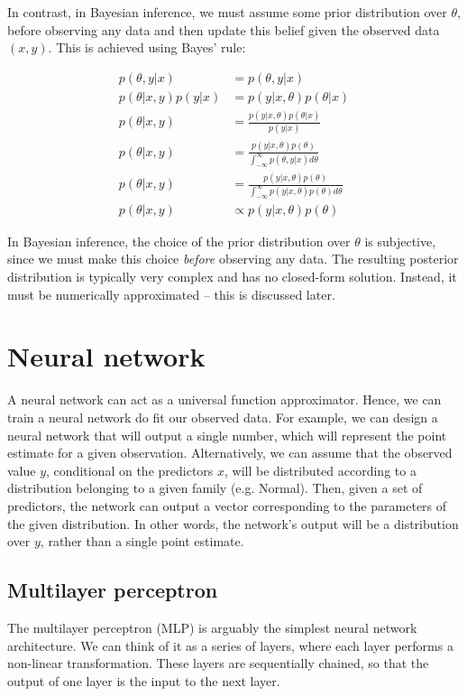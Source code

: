 \documentclass[12pt]{article}
\begin{document}
In contrast, in Bayesian inference, we must assume some prior distribution over $\theta$, before observing any data and then update this belief given the observed data $(x, y)$. This is achieved using Bayes' rule:

\begin{align}
p(\theta,y|x) &= p(\theta,y|x) \\
p(\theta|x,y)p(y|x) &= p(y|x,\theta)p(\theta|x)\\
p(\theta|x,y) &= \frac{p(y|x,\theta)p(\theta|x)}{p(y|x)}\\
p(\theta|x,y) &= \frac{p(y|x,\theta)p(\theta)}{\int_{-\infty}^\infty p(\theta, y|x) d\theta}\\
p(\theta|x,y) &= \frac{p(y|x,\theta)p(\theta)}{\int_{-\infty}^\infty p(y|x,\theta)p(\theta) d\theta}\\
p(\theta|x,y) &\propto p(y|x,\theta)p(\theta)
\end{align}
\label{eq_posterior}

In Bayesian inference, the choice of the prior distribution over $\theta$ is subjective, since we must make this choice \textit{before} observing any data. The resulting posterior distribution is typically very complex and has no closed-form solution. Instead, it must be numerically approximated -- this is discussed later.

\section{Neural network}

A neural network can act as a universal function approximator. Hence, we can train a neural network do fit our observed data. For example, we can design a neural network that will output a single number, which will represent the point estimate for a given observation. Alternatively, we can assume that the observed value $y$, conditional on the predictors $x$, will be distributed according to a distribution belonging to a given family (e.g. Normal). Then, given a set of predictors, the network can output a vector corresponding to the parameters of the given distribution. In other words, the network's output will be a distribution over $y$, rather than a single point estimate. 

\subsection{Multilayer perceptron}

The multilayer perceptron (MLP) is arguably the simplest neural network architecture. We can think of it as a series of layers, where each layer performs a non-linear transformation. These layers are sequentially chained, so that the output of one layer is the input to the next layer.
\end{document}

